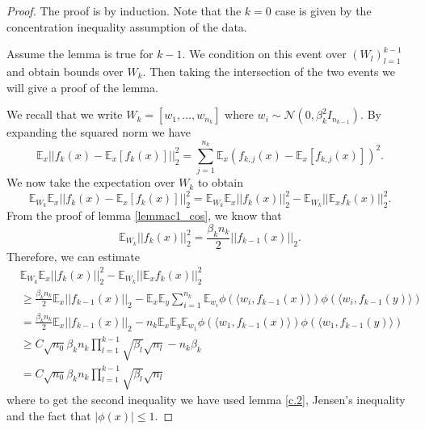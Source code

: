 \documentclass{article}
\theoremstyle{plain}
\theoremstyle{definition}
\theoremstyle{remark}
\begin{document}
\begin{proof}
The proof is by induction. Note that the $k = 0$ case is given by the concentration inequality assumption of the data. 

Assume the lemma is true for $k-1$. We condition on this event over 
$(W_l)_{l=1}^{k-1}$ and obtain bounds over $W_k$. Then taking the intersection of the two events we will give a proof of the lemma.

We recall that we write $W_k = [w_1,\ldots, w_{n_k}]$ where 
$w_i \sim \mathcal{N}(0, \beta_k^2I_{n_{k-1}})$. By expanding the squared norm we have
\begin{equation*}
\mathbb{E}_x\vert\vert f_k(x) - \mathbb{E}_x[f_k(x)]\vert\vert_2^2 = 
\sum_{j=1}^{n_k}\mathbb{E}_x(f_{k,j}(x) - \mathbb{E}_x[f_{k,j}(x)])^2.
\end{equation*}
We now take the expectation over $W_k$ to obtain
\begin{equation*}
	\mathbb{E}_{W_k}\mathbb{E}_x\vert\vert f_k(x) - 
	\mathbb{E}_x[f_k(x)]\vert\vert^2_2 =
	\mathbb{E}_{W_k}\mathbb{E}_x\vert\vert f_k(x)\vert\vert_2^2 - 
	\mathbb{E}_{W_k}\vert\vert \mathbb{E}_xf_k(x)\vert\vert_2^2.
\end{equation*}
From the proof of lemma \ref{lemmac1_cos}, we know that
\begin{equation*}
\mathbb{E}_{W_k}\vert\vert f_k(x)\vert\vert_2^2 = 
\frac{\beta_kn_k}{2}\vert\vert f_{k-1}(x)\vert\vert_2.
\end{equation*}
Therefore, we can estimate
\begin{align*}
&\mathbb{E}_{W_k}\mathbb{E}_x\vert\vert f_k(x)\vert\vert_2^2 - 
	\mathbb{E}_{W_k}\vert\vert \mathbb{E}_xf_k(x)\vert\vert_2^2 \\
	&\geq
	\frac{\beta_kn_k}{2}\mathbb{E}_x\vert\vert f_{k-1}(x)\vert\vert_2 - 
	\mathbb{E}_x\mathbb{E}_y
	\sum_{i=1}^{n_k}\mathbb{E}_{w_i}
	\phi(\langle w_i, f_{k-1}(x)\rangle)\phi(\langle w_i, f_{k-1}(y)\rangle) \\
	&=
	\frac{\beta_kn_k}{2}\mathbb{E}_x\vert\vert f_{k-1}(x)\vert\vert_2 - 
	n_k\mathbb{E}_x\mathbb{E}_y
	\mathbb{E}_{w_1}
	\phi(\langle w_1, f_{k-1}(x)\rangle)\phi(\langle w_1, f_{k-1}(y)\rangle) \\
	&\geq
	C\sqrt{n_0}\beta_kn_k\prod_{l=1}^{k-1}\sqrt{\beta_l}\sqrt{n_l} 
	- n_k\beta_k \\
	&=
	C\sqrt{n_0}\beta_kn_k\prod_{l=1}^{k-1}\sqrt{\beta_l}\sqrt{n_l}
\end{align*}
where to get the second inequality we have used lemma \ref{c.2}, Jensen's inequality and the fact that $\vert\phi(x)\vert \leq 1$.

\end{proof}
\end{document}
